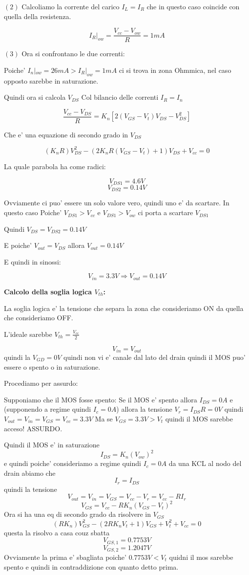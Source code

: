\documentclass[\main/main.tex]{subfiles}
\begin{document}
$(2)$ Calcoliamo la corrente del carico $I_{L} = I_{R}$ che in questo caso coincide con quella della resistenza.

\[I_R|_{ow} = \frac{V_{cc} - V_{ow}}{R} = 1mA\]

$(3)$ Ora si confrontano le due correnti:

Poiche' $I_n|_{ow} = 26mA > I_R|_{ow} = 1mA$ ci si trova in zona Ohmmica, nel caso opposto sarebbe in saturazione.

Quindi ora si calcola $V_{DS}$ Col bilancio delle correnti $I_R = I_n$

\[\frac{V_{cc} - V_{DS}}{R} = K_n \left[ 2 \left(V_{GS} - V_t \right)V_{DS} - V_{DS}^2 \right]\]

Che e' una equazione di secondo grado in $V_{DS}$

\[\left(K_n R \right) V_{DS}^2 - \left(2K_nR\left(V_{GS}-V_t\right)+1\right)V_{DS}+V_{cc} = 0\]

La quale parabola ha come radici:

\[V_{DS1} = 4.6V \]
\[V_{DS2} = 0.14V \]

Ovviamente ci puo' essere un solo valore vero, quindi uno e' da scartare.
In questo caso Poiche' $V_{DS1} > V_{cc}$ e $V_{DS1} > V_{ow}$ ci porta a scartare $V_{DS1}$

Quindi $V_{DS} = V_{DS2} = 0.14V$

E poiche' $V_{out} = V_{DS}$ allora $V_{out} = 0.14V$

E quindi in sinossi:

\[V_{in} = 3.3V \Rightarrow V_{out} = 0.14V\]

\clearpage
\textbf{Calcolo della soglia logica $V_{th}$:}

La soglia logica e' la tensione che separa la zona che consideriamo ON da quella che consideriamo OFF.

L'ideale sarebbe $V_{th} = \frac{V_{cc}}{2}$

\[V_{in} = V_{out}\]
quindi la $V_{GD} = 0V$ quindi non vi e' canale dal lato del drain quindi il MOS puo' essere o spento o in saturazione.

Procediamo per assurdo:

Supponiamo che il MOS fosse spento:
Se il MOS e' spento allora $I_{DS} = 0A$ e (supponendo a regime quindi $I_c = 0A$) allora la tensione $V_r = I_{DS} R = 0V$ quindi $V_{out} = V_{in} = V_{GS} = V_{cc} = 3.3V$
Ma se $V_{GS} = 3.3V > V_t$ quindi il MOS sarebbe acceso!
ASSURDO.

Quindi il MOS e' in saturazione
\[I_{DS} = K_n \left(V_{ow}\right)^2 \]
e quindi poiche' consideriamo a regime quindi $I_c = 0A$
da una KCL al nodo del drain abiamo che
\[I_r = I_{DS} \]
quindi la tensione
\[V_{out} = V_{in} = V_{GS} = V_{cc} - V_r = V_{cc} - R I_r\]
\[V_{GS} = V_{cc} - R K_n \left(V_{GS} - V_t \right)^2\]
Ora si ha una eq di secondo grado da risolvere in $V_{GS}$
\[(R K_n)V_{GS}^2 - (2 R K_n V_t + 1)V_{GS} + V_t^2 + V_{cc} = 0\]
questa la risolvo a casa couz sbatta
\[V_{GS,1} = 0.7753V\]
\[V_{GS,2} = 1.2047V\]
Ovviamente la prima e' sbagliata poiche' $0.7753V < V_t$ quidni il mos sarebbe spento e quindi in contraddizione con quanto detto prima.
\end{document}
